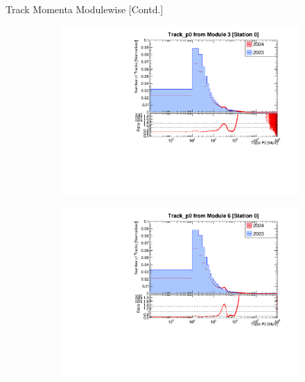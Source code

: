 \begin{frame}{Track Momenta Modulewise [Contd.]}
    \begin{figure}
        \centering
        \begin{subfigure}[t]{0.49\linewidth}
            \includegraphics[width=\linewidth]{./ModuleLevelPlots/Track_p0_st0_module3_linear.pdf}
        \end{subfigure}
        \begin{subfigure}[t]{0.49\linewidth}
            \includegraphics[width=\linewidth]{./ModuleLevelPlots/Track_p0_st0_module6_linear.pdf}
        \end{subfigure}


\end{figure}
\end{frame}
